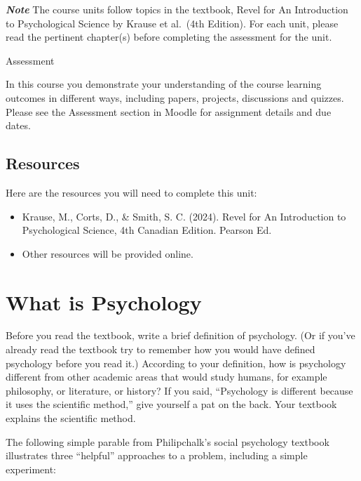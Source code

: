 \documentclass[
]{book}
\providecommand{\tightlist}{%
  \setlength{\itemsep}{0pt}\setlength{\parskip}{0pt}}
\begin{document}
\begin{caution}
\textbf{\emph{Note}}
The course units follow topics in the textbook, Revel for An Introduction to Psychological Science by Krause et al.~(4th Edition). For each unit, please read the pertinent chapter(s) before completing the assessment for the unit.
\end{caution}

\begin{assessment}
{Assessment}

In this course you demonstrate your understanding of the course learning outcomes in different ways, including papers, projects, discussions and quizzes. Please see the Assessment section in Moodle for assignment details and due dates.
\end{assessment}

\hypertarget{resources}{%
\subsection*{Resources}\label{resources}}

Here are the resources you will need to complete this unit:

\begin{itemize}
\tightlist
\item
  Krause, M., Corts, D., \& Smith, S. C. (2024). Revel for An Introduction to Psychological Science, 4th Canadian Edition. Pearson Ed.\\
\item
  Other resources will be provided online.
\end{itemize}

\hypertarget{what-is-psychology}{%
\section{What is Psychology}\label{what-is-psychology}}

Before you read the textbook, write a brief definition of psychology. (Or if you've already read the textbook try to remember how you would have defined psychology before you read it.) According to your definition, how is psychology different from other academic areas that would study humans, for example philosophy, or literature, or history? If you said, ``Psychology is different because it uses the scientific method,'' give yourself a pat on the back.
Your textbook explains the scientific method.

The following simple parable from Philipchalk's social psychology textbook illustrates three ``helpful'' approaches to a problem, including a simple experiment:
\end{document}
